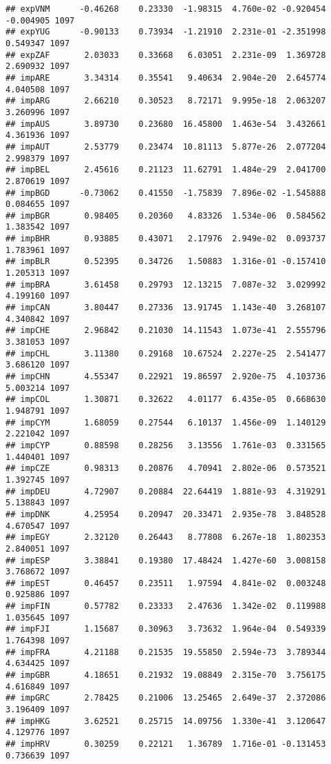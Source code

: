 \documentclass[
]{article}
\begin{document}
\begin{verbatim}
## expVNM      -0.46268    0.23330  -1.98315  4.760e-02 -0.920454 -0.004905 1097
## expYUG      -0.90133    0.73934  -1.21910  2.231e-01 -2.351998  0.549347 1097
## expZAF       2.03033    0.33668   6.03051  2.231e-09  1.369728  2.690932 1097
## impARE       3.34314    0.35541   9.40634  2.904e-20  2.645774  4.040508 1097
## impARG       2.66210    0.30523   8.72171  9.995e-18  2.063207  3.260996 1097
## impAUS       3.89730    0.23680  16.45800  1.463e-54  3.432661  4.361936 1097
## impAUT       2.53779    0.23474  10.81113  5.877e-26  2.077204  2.998379 1097
## impBEL       2.45616    0.21123  11.62791  1.484e-29  2.041700  2.870619 1097
## impBGD      -0.73062    0.41550  -1.75839  7.896e-02 -1.545888  0.084655 1097
## impBGR       0.98405    0.20360   4.83326  1.534e-06  0.584562  1.383542 1097
## impBHR       0.93885    0.43071   2.17976  2.949e-02  0.093737  1.783961 1097
## impBLR       0.52395    0.34726   1.50883  1.316e-01 -0.157410  1.205313 1097
## impBRA       3.61458    0.29793  12.13215  7.087e-32  3.029992  4.199160 1097
## impCAN       3.80447    0.27336  13.91745  1.143e-40  3.268107  4.340842 1097
## impCHE       2.96842    0.21030  14.11543  1.073e-41  2.555796  3.381053 1097
## impCHL       3.11380    0.29168  10.67524  2.227e-25  2.541477  3.686120 1097
## impCHN       4.55347    0.22921  19.86597  2.920e-75  4.103736  5.003214 1097
## impCOL       1.30871    0.32622   4.01177  6.435e-05  0.668630  1.948791 1097
## impCYM       1.68059    0.27544   6.10137  1.456e-09  1.140129  2.221042 1097
## impCYP       0.88598    0.28256   3.13556  1.761e-03  0.331565  1.440401 1097
## impCZE       0.98313    0.20876   4.70941  2.802e-06  0.573521  1.392745 1097
## impDEU       4.72907    0.20884  22.64419  1.881e-93  4.319291  5.138843 1097
## impDNK       4.25954    0.20947  20.33471  2.935e-78  3.848528  4.670547 1097
## impEGY       2.32120    0.26443   8.77808  6.267e-18  1.802353  2.840051 1097
## impESP       3.38841    0.19380  17.48424  1.427e-60  3.008158  3.768672 1097
## impEST       0.46457    0.23511   1.97594  4.841e-02  0.003248  0.925886 1097
## impFIN       0.57782    0.23333   2.47636  1.342e-02  0.119988  1.035645 1097
## impFJI       1.15687    0.30963   3.73632  1.964e-04  0.549339  1.764398 1097
## impFRA       4.21188    0.21535  19.55850  2.594e-73  3.789344  4.634425 1097
## impGBR       4.18651    0.21932  19.08849  2.315e-70  3.756175  4.616849 1097
## impGRC       2.78425    0.21006  13.25465  2.649e-37  2.372086  3.196409 1097
## impHKG       3.62521    0.25715  14.09756  1.330e-41  3.120647  4.129776 1097
## impHRV       0.30259    0.22121   1.36789  1.716e-01 -0.131453  0.736639 1097

\end{verbatim}
\end{document}
